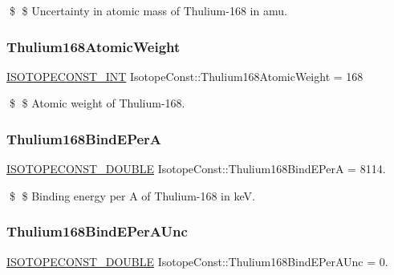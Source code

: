 \$ \$ Uncertainty in atomic mass of Thulium-\/168 in amu. \mbox{\label{group___isotope_const-_thulium-_tm168_gab826a99ddeaf2f0c3f2d0aa86946a1d4}} 
\subsubsection{\texorpdfstring{Thulium168\+Atomic\+Weight}{Thulium168AtomicWeight}}
{\footnotesize\ttfamily \mbox{\hyperlink{group___isotope_const-_macros_ga5f18360b3e99483a35c32d789e62621c}{I\+S\+O\+T\+O\+P\+E\+C\+O\+N\+S\+T\+\_\+\+I\+NT}} Isotope\+Const\+::\+Thulium168\+Atomic\+Weight = 168}

\$ \$ Atomic weight of Thulium-\/168. \mbox{\label{group___isotope_const-_thulium-_tm168_ga88b4a1e841ef61bc92d4112736ffbc90}} 
\subsubsection{\texorpdfstring{Thulium168\+Bind\+E\+PerA}{Thulium168BindEPerA}}
{\footnotesize\ttfamily \mbox{\hyperlink{group___isotope_const-_macros_ga8f45a7272ce02c0b4c65c44636ed719a}{I\+S\+O\+T\+O\+P\+E\+C\+O\+N\+S\+T\+\_\+\+D\+O\+U\+B\+LE}} Isotope\+Const\+::\+Thulium168\+Bind\+E\+PerA = 8114.}

\$ \$ Binding energy per A of Thulium-\/168 in keV. \mbox{\label{group___isotope_const-_thulium-_tm168_gab461a55057661bfa27148c58b133420e}} 
\subsubsection{\texorpdfstring{Thulium168\+Bind\+E\+Per\+A\+Unc}{Thulium168BindEPerAUnc}}
{\footnotesize\ttfamily \mbox{\hyperlink{group___isotope_const-_macros_ga8f45a7272ce02c0b4c65c44636ed719a}{I\+S\+O\+T\+O\+P\+E\+C\+O\+N\+S\+T\+\_\+\+D\+O\+U\+B\+LE}} Isotope\+Const\+::\+Thulium168\+Bind\+E\+Per\+A\+Unc = 0.}

